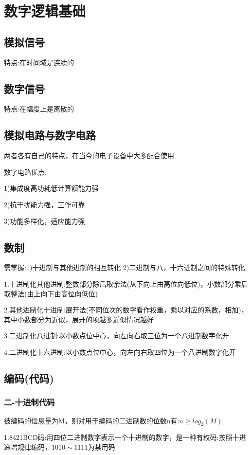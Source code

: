 \documentclass[11pt,twoside,a4paper]{ctexart}
\begin{document}
\section{数字逻辑基础}
\subsection{模拟信号}
特点:在时间域是连续的
\subsection{数字信号}
特点:在幅度上是离散的
\subsection{模拟电路与数字电路}
两者各有自己的特点，在当今的电子设备中大多配合使用

数字电路优点:
\begin{minipage}[t]{0.9\linewidth}
    1)集成度高功耗低计算额能力强

    2)抗干扰能力强，工作可靠

    3)功能多样化，适应能力强

\end{minipage}

\subsection{数制}
需掌握:1)十进制与其他进制的相互转化 2)二进制与八，十六进制之间的特殊转化

1.十进制化其他进制:整数部分除后取余法(从下向上由高位向低位)，小数部分乘后取整法(由上向下由高位向低位)

2.其他进制化十进制:展开法(不同位次的数字看作权重，乘以对应的系数，相加)，其中小数部分为近似，展开的项越多近似情况越好

3.二进制化八进制:以小数点位中心，向左向右取三位为一个八进制数字化开

4.二进制化十六进制:以小数点位中心，向左向右取四位为一个八进制数字化开

\subsection{编码(代码)}
\subsubsection{二-十进制代码}
被编码的信息量为M，则对用于编码的二进制数的位数n有:$n \geq log_2(M) $

1.8421BCD码:用四位二进制数字表示一个十进制的数字，是一种有权码:按照十进递增规律编码，$ 1010 \sim  1111 $为禁用码
\end{document}

